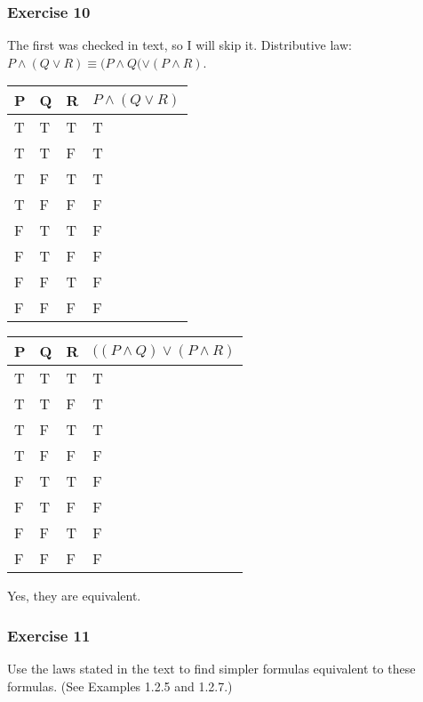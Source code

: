 \subsubsection{Exercise 10}

\question The first was checked in text, so I will skip it.  Distributive law: $P \wedge (Q \vee R) \equiv (P \wedge Q( \vee (P \wedge R)$.
    \begin{solution}
        \begin{tabular}[c]{l l l | l}
            P & Q & R & $P \wedge (Q \vee R)$ \\ \hline
            T & T & T & T \\
            T & T & F & T \\
            T & F & T & T \\
            T & F & F & F \\
            F & T & T & F \\
            F & T & F & F \\
            F & F & T & F \\
            F & F & F & F
        \end{tabular}
        
        \begin{tabular}[c]{l l l | l}
            P & Q & R & $((P \wedge Q) \vee (P \wedge R)$ \\ \hline
            T & T & T & T \\
            T & T & F & T \\
            T & F & T & T \\
            T & F & F & F \\
            F & T & T & F \\
            F & T & F & F \\
            F & F & T & F \\
            F & F & F & F
        \end{tabular}
        Yes, they are equivalent.
    \end{solution}

\subsubsection{Exercise 11}
\question Use the laws stated in the text to find simpler formulas equivalent to these formulas. (See Examples 1.2.5 and 1.2.7.)

